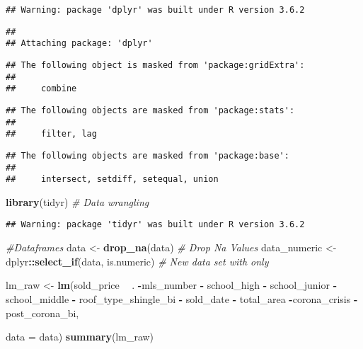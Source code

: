 \documentclass[
]{article}
\newenvironment{Shaded}{\begin{snugshade}}{\end{snugshade}}
\newcommand{\CommentTok}[1]{\textcolor[rgb]{0.56,0.35,0.01}{\textit{#1}}}
\newcommand{\DataTypeTok}[1]{\textcolor[rgb]{0.13,0.29,0.53}{#1}}
\newcommand{\KeywordTok}[1]{\textcolor[rgb]{0.13,0.29,0.53}{\textbf{#1}}}
\newcommand{\NormalTok}[1]{#1}
\newcommand{\OperatorTok}[1]{\textcolor[rgb]{0.81,0.36,0.00}{\textbf{#1}}}
\newcommand{\StringTok}[1]{\textcolor[rgb]{0.31,0.60,0.02}{#1}}
\begin{document}
\begin{verbatim}
## Warning: package 'dplyr' was built under R version 3.6.2
\end{verbatim}

\begin{verbatim}
## 
## Attaching package: 'dplyr'
\end{verbatim}

\begin{verbatim}
## The following object is masked from 'package:gridExtra':
## 
##     combine
\end{verbatim}

\begin{verbatim}
## The following objects are masked from 'package:stats':
## 
##     filter, lag
\end{verbatim}

\begin{verbatim}
## The following objects are masked from 'package:base':
## 
##     intersect, setdiff, setequal, union
\end{verbatim}

\begin{Shaded}
\begin{Highlighting}[]
\KeywordTok{library}\NormalTok{(tidyr) }\CommentTok{# Data wrangling}
\end{Highlighting}
\end{Shaded}

\begin{verbatim}
## Warning: package 'tidyr' was built under R version 3.6.2
\end{verbatim}

\begin{Shaded}
\begin{Highlighting}[]
\CommentTok{#Dataframes}
\NormalTok{data <-}\StringTok{ }\KeywordTok{drop_na}\NormalTok{(data) }\CommentTok{# Drop Na Values}
\NormalTok{data_numeric <-}\StringTok{ }\NormalTok{dplyr}\OperatorTok{::}\KeywordTok{select_if}\NormalTok{(data, is.numeric) }\CommentTok{# New data set with only }
\end{Highlighting}
\end{Shaded}

\begin{Shaded}
\begin{Highlighting}[]
\NormalTok{lm_raw <-}\StringTok{ }\KeywordTok{lm}\NormalTok{(sold_price }\OperatorTok{~}\StringTok{ }\NormalTok{. }\OperatorTok{-}\NormalTok{mls_number }
               \OperatorTok{-}\StringTok{ }\NormalTok{school_high }\OperatorTok{-}\StringTok{ }\NormalTok{school_junior }
               \OperatorTok{-}\StringTok{ }\NormalTok{school_middle }\OperatorTok{-}\StringTok{ }\NormalTok{roof_type_shingle_bi}
               \OperatorTok{-}\StringTok{ }\NormalTok{sold_date }\OperatorTok{-}\StringTok{ }\NormalTok{total_area }\OperatorTok{-}\NormalTok{corona_crisis}
               \OperatorTok{-}\StringTok{ }\NormalTok{post_corona_bi, }
                              
                               \DataTypeTok{data =}\NormalTok{ data)}
\KeywordTok{summary}\NormalTok{(lm_raw)}
\end{Highlighting}
\end{Shaded}
\end{document}
